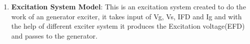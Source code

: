 \begin{enumerate}
%		
%		
%		
%				
%				
%		
%		
	
\item \textbf{\large Excitation System Model}: This is an excitation system created to do the work of an generator exciter, it takes input of Vg, Vs, IFD and Ig and with the help of different exciter system it  produces the Excitation voltage(EFD) and passes to the generator.
	

\end{enumerate}
